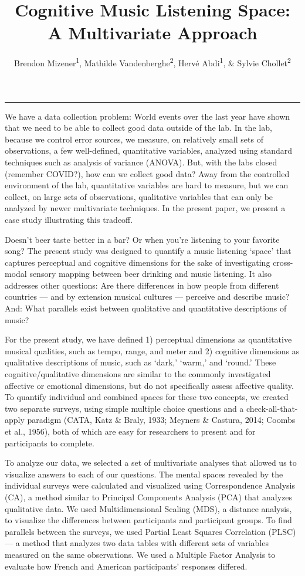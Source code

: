 \documentclass[
  english,
  man,floatsintext]{apa6}
\title{Cognitive Music Listening Space: A Multivariate Approach}
\author{Brendon Mizener\textsuperscript{1}, Mathilde Vandenberghe\textsuperscript{2}, Hervé Abdi\textsuperscript{1}, \& Sylvie Chollet\textsuperscript{2}}
\date{}
\affiliation{\vspace{0.5cm}\textsuperscript{1} University of Texas at Dallas\\\textsuperscript{2} YNCREA}
\begin{document}
\maketitle

\begin{center}\rule{0.5\linewidth}{0.5pt}\end{center}

We have a data collection problem: World events over the last year have shown that we need to be able to collect good data outside of the lab. In the lab, because we control error sources, we measure, on relatively small sets of observations, a few well-defined, quantitative variables, analyzed using standard techniques such as analysis of variance (ANOVA). But, with the labs closed (remember COVID?), how can we collect good data? Away from the controlled environment of the lab, quantitative variables are hard to measure, but we can collect, on large sets of observations, qualitative variables that can only be analyzed by newer multivariate techniques. In the present paper, we present a case study illustrating this tradeoff.

Doesn't beer taste better in a bar? Or when you're listening to your favorite song? The present study was designed to quantify a music listening `space' that captures perceptual and cognitive dimensions for the sake of investigating cross-modal sensory mapping between beer drinking and music listening. It also addresses other questions: Are there differences in how people from different countries --- and by extension musical cultures --- perceive and describe music? And: What parallels exist between qualitative and quantitative descriptions of music?

For the present study, we have defined 1) perceptual dimensions as quantitative musical qualities, such as tempo, range, and meter and 2) cognitive dimensions as qualitative descriptions of music, such as `dark,' `warm,' and `round.' These cognitive/qualitative dimensions are similar to the commonly investigated affective or emotional dimensions, but do not specifically assess affective quality. To quantify individual and combined spaces for these two concepts, we created two separate surveys, using simple multiple choice questions and a check-all-that-apply paradigm (CATA, Katz \& Braly, 1933; Meyners \& Castura, 2014; Coombs et al., 1956), both of which are easy for researchers to present and for participants to complete.

To analyze our data, we selected a set of multivariate analyses that allowed us to visualize answers to each of our questions. The mental spaces revealed by the individual surveys were calculated and visualized using Correspondence Analysis (CA), a method similar to Principal Components Analysis (PCA) that analyzes qualitative data. We used Multidimensional Scaling (MDS), a distance analysis, to visualize the differences between participants and participant groups. To find parallels between the surveys, we used Partial Least Squares Correlation (PLSC) --- a method that analyzes two data tables with different sets of variables measured on the same observations. We used a Multiple Factor Analysis to evaluate how French and American participants' responses differed.
\end{document}
